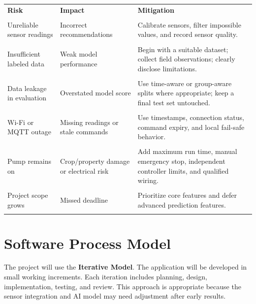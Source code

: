 \documentclass[12pt,a4paper]{report}
\begin{document}
\begin{longtable}{p{}p{}p{}}

\toprule

\textbf{Risk} & \textbf{Impact} & \textbf{Mitigation}\\\\

\midrule

Unreliable sensor readings & Incorrect recommendations & Calibrate sensors, filter impossible values, and record sensor quality.\\\\

Insufficient labeled data & Weak model performance & Begin with a suitable dataset; collect field observations; clearly disclose limitations.\\\\

Data leakage in evaluation & Overstated model score & Use time-aware or group-aware splits where appropriate; keep a final test set untouched.\\\\

Wi-Fi or MQTT outage & Missing readings or stale commands & Use timestamps, connection status, command expiry, and local fail-safe behavior.\\\\

Pump remains on & Crop/property damage or electrical risk & Add maximum run time, manual emergency stop, independent controller limits, and qualified wiring.\\\\

Project scope grows & Missed deadline & Prioritize core features and defer advanced prediction features.\\\\

\bottomrule

\end{longtable}

\chapter{Software Process Model}

The project will use the \textbf{Iterative Model}. The application will be developed in small working increments. Each iteration includes planning, design, implementation, testing, and review. This approach is appropriate because the sensor integration and AI model may need adjustment after early results.
\end{document}
